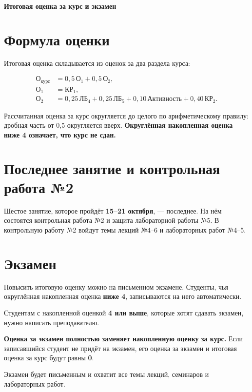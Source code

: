 \documentclass[a4paper,14pt]{extarticle}
\begin{document}
\thispagestyle{empty}

\begin{center}
    {\Large\textbf{Итоговая оценка за курс и экзамен}}
\end{center}

\section*{Формула оценки}

Итоговая оценка складывается из оценок за два раздела курса:

\[
\begin{aligned}
    \text{О}_{\text{курс}} &= 0{,}5\,\text{О}_1 + 0{,}5\,\text{О}_2,\\
    \text{О}_1 &= \text{КР}_1,\\
    \text{О}_2 &= 0{,}25\,\text{ЛБ}_4 + 0{,}25\,\text{ЛБ}_5
        + 0{,}10\,\text{Активность} + 0{,}40\,\text{КР}_2.
\end{aligned}
\]

Рассчитанная оценка за курс округляется до целого по арифметическому правилу:
дробная часть от 0{,}5 округляется вверх. \textbf{Округлённая накопленная
оценка ниже 4 означает, что курс не сдан.}

\section*{Последнее занятие и контрольная работа №2}

Шестое занятие, которое пройдёт \textbf{15--21 октября}, --- последнее. На нём
состоятся контрольная работа №2 и защита лабораторной работы №5. В контрольную
работу №2 войдут темы лекций №4--6 и лабораторных работ №4--5.

\section*{Экзамен}

Повысить итоговую оценку можно на письменном экзамене. Студенты, чья округлённая
накопленная оценка \textbf{ниже 4}, записываются на него автоматически.

Студентам с накопленной оценкой \textbf{4 или выше}, которые хотят сдавать
экзамен, нужно написать преподавателю.

\textbf{Оценка за экзамен полностью заменяет накопленную оценку за курс.} Если
записавшийся студент не придёт на экзамен, его оценка за экзамен и итоговая
оценка за курс будут равны \textbf{0}.

Экзамен будет письменным и охватит все темы лекций, семинаров и лабораторных
работ.
\end{document}
